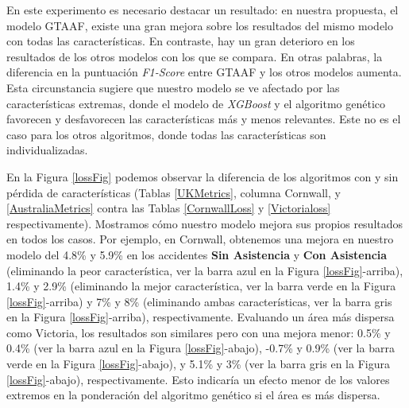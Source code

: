 En este experimento es necesario destacar un resultado: en nuestra propuesta, el modelo GTAAF, existe una gran mejora sobre los resultados del mismo modelo con todas las características. En contraste, hay un gran deterioro en los resultados de los otros modelos con los que se compara. En otras palabras, la diferencia en la puntuación \textit{F1-Score} entre GTAAF y los otros modelos aumenta. Esta circunstancia sugiere que nuestro modelo se ve afectado por las características extremas, donde el modelo de \textit{XGBoost} y el algoritmo genético favorecen y desfavorecen las características más y menos relevantes. Este no es el caso para los otros algoritmos, donde todas las características son individualizadas.

En la Figura \ref{lossFig} podemos observar la diferencia de los algoritmos con y sin pérdida de características (Tablas \ref{UKMetrics}, columna Cornwall, y \ref{AustraliaMetrics} contra las Tablas \ref{CornwallLoss} y \ref{Victorialoss} respectivamente). Mostramos cómo nuestro modelo mejora sus propios resultados en todos los casos. Por ejemplo, en Cornwall, obtenemos una mejora en nuestro modelo del 4.8\% y 5.9\% en los accidentes \textbf{Sin Asistencia} y \textbf{Con Asistencia} (eliminando la peor característica, ver la barra azul en la Figura \ref{lossFig}-arriba), 1.4\% y 2.9\% (eliminando la mejor característica, ver la barra verde en la Figura \ref{lossFig}-arriba) y 7\% y 8\% (eliminando ambas características, ver la barra gris en la Figura \ref{lossFig}-arriba), respectivamente. Evaluando un área más dispersa como Victoria, los resultados son similares pero con una mejora menor: 0.5\% y 0.4\% (ver la barra azul en la Figura \ref{lossFig}-abajo), -0.7\% y 0.9\% (ver la barra verde en la Figura \ref{lossFig}-abajo), y 5.1\% y 3\% (ver la barra gris en la Figura \ref{lossFig}-abajo), respectivamente. Esto indicaría un efecto menor de los valores extremos en la ponderación del algoritmo genético si el área es más dispersa.

